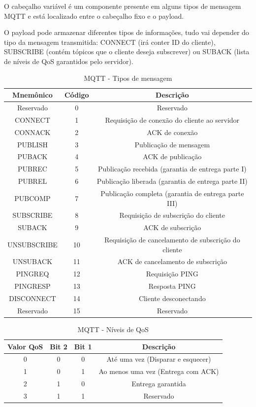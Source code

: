 O cabeçalho variável é um componente presente em alguns tipos de mensagem
MQTT e está localizado entre o cabeçalho fixo e o payload.

O payload pode armazenar diferentes tipos de informações, tudo vai
depender do tipo da mensagem transmitida: CONNECT (irá conter ID do
cliente), SUBSCRIBE (contém tópicos que o cliente deseja subscrever)
ou SUBACK (lista de níveis de QoS garantidos pelo servidor).

\begin{table}[h]
\begin{centering}
\begin{tabular}{|c|c|c|}
\hline 
Mnemônico & Código & Descrição\tabularnewline
\hline 
\hline 
Reservado & 0 & Reservado\tabularnewline
\hline 
CONNECT & 1 & Requisição de conexão do cliente ao servidor\tabularnewline
\hline 
CONNACK & 2 & ACK de conexão\tabularnewline
\hline 
PUBLISH & 3 & Publicação de mensagem\tabularnewline
\hline 
PUBACK & 4 & ACK de publicação\tabularnewline
\hline 
PUBREC & 5 & Publicação recebida (garantia de entrega parte I)\tabularnewline
\hline 
PUBREL & 6 & Publicação liberada (garantia de entrega parte II)\tabularnewline
\hline 
PUBCOMP & 7 & Publicação completa (garantia de entrega parte III)\tabularnewline
\hline 
SUBSCRIBE & 8 & Requisição de subscrição do cliente\tabularnewline
\hline 
SUBACK & 9 & ACK de subscrição\tabularnewline
\hline 
UNSUBSCRIBE & 10 & Requisição de cancelamento de subscrição do cliente\tabularnewline
\hline 
UNSUBACK & 11 & ACK de cancelamento de subscrição\tabularnewline
\hline 
PINGREQ & 12 & Requisição PING\tabularnewline
\hline 
PINGRESP & 13 & Resposta PING\tabularnewline
\hline 
DISCONNECT & 14 & Cliente desconectando\tabularnewline
\hline 
Reservado & 15 & Reservado\tabularnewline
\hline 
\end{tabular}
\par\end{centering}
\caption{MQTT - Tipos de mensagem \cite{mqtt:spec}\label{tab:mqtt}}
\end{table}

\begin{table}[h]
\begin{centering}
\begin{tabular}{|c|c|c|c|}
\hline 
Valor QoS & Bit 2 & Bit 1 & Descrição\tabularnewline
\hline 
\hline 
0 & 0 & 0 & Até uma vez (Disparar e esquecer)\tabularnewline
\hline 
1 & 0 & 1 & Ao menos uma vez (Entrega com ACK)\tabularnewline
\hline 
2 & 1 & 0 & Entrega garantida\tabularnewline
\hline 
3 & 1 & 1 & Reservado\tabularnewline
\hline 
\end{tabular}
\par\end{centering}
\caption{MQTT - Níveis de QoS \cite{mqtt:spec}\label{tab:mqtt_qos}}
\end{table}


